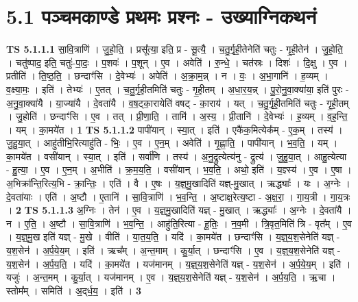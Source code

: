 \documentclass[17pt]{extarticle}
\begin{document}
\section*{ 5.1      पञ्चमकाण्डे प्रथमः प्रश्नः - उख्याग्निकथनं }
                                \textbf{ TS 5.1.1.1} \newline
                  सा॒वि॒त्राणि॑ । जु॒हो॒ति॒ । प्रसू᳚त्या॒ इति॒ प्र - सू॒त्यै॒ । च॒तु॒र्गृ॒ही॒तेनेति॑ चतुः - गृ॒ही॒तेन॑ । जु॒हो॒ति॒ । चतु॑ष्पाद॒ इति॒ चतुः॑-पा॒दः॒ । प॒शवः॑ । प॒शून् । ए॒व । अवेति॑ । रु॒न्धे॒ । चत॑स्रः । दिशः॑ । दि॒क्षु । ए॒व । प्रतीति॑ । ति॒ष्ठ॒ति॒ । छन्दाꣳ॑सि । दे॒वेभ्यः॑ । अपेति॑ । अ॒क्रा॒म॒न्न् । न । वः॒ । अ॒भा॒गानि॑ । ह॒व्यम् । व॒क्ष्या॒मः॒ । इति॑ । तेभ्यः॑ । ए॒तत् । च॒तु॒र्गृ॒ही॒तमिति॑ चतुः - गृ॒ही॒तम् । अ॒धा॒र॒य॒न्न् । पु॒रो॒नु॒वा॒क्या॑या॒ इति॑ पुरः - अ॒नु॒वा॒क्या॑यै । या॒ज्या॑यै । दे॒वता॑यै । व॒ष॒ट्का॒रायेति॑ वषट् - का॒राय॑ । यत् । च॒तु॒र्गृ॒ही॒तमिति॑ चतुः - गृ॒ही॒तम् । जु॒होति॑ । छन्दाꣳ॑सि । ए॒व । तत् । प्री॒णा॒ति॒ । तामि॑ । अ॒स्य॒ । प्री॒तानि॑ । दे॒वेभ्यः॑ । ह॒व्यम् । व॒ह॒न्ति॒ । यम् । का॒मये॑त । \textbf{  1} \newline
                  \newline
                                \textbf{ TS 5.1.1.2} \newline
                  पापी॑यान् । स्या॒त् । इति॑ । एकै॑क॒मित्येक᳚म् - ए॒क॒म् । तस्य॑ । जु॒हु॒या॒त् । आहु॑तीभि॒रित्याहु॑ति - भिः॒ । ए॒व । ए॒न॒म् । अवेति॑ । गृ॒ह्णा॒ति॒ । पापी॑यान् । भ॒व॒ति॒ । यम् । का॒मये॑त । वसी॑यान् । स्या॒त् । इति॑ । सर्वा॑णि । तस्य॑ । अ॒नु॒द्रुत्येत्य॑नु - द्रुत्य॑ । जु॒हु॒या॒त् । आहु॒त्येत्या - हु॒त्या॒ । ए॒व । ए॒न॒म् । अ॒भीति॑ । क्र॒म॒य॒ति॒ । वसी॑यान् । भ॒व॒ति॒ । अथो॒ इति॑ । य॒ज्ञ्स्य॑ । ए॒व । ए॒षा । अ॒भिक्रा᳚न्ति॒रित्य॒भि -  क्रा॒न्तिः॒ । एति॑ । वै । ए॒षः । य॒ज्ञ्॒मु॒खादिति॑ यज्ञ्-मु॒खात् । ऋद्ध्याः᳚ । यः । अ॒ग्नेः । दे॒वता॑याः । एति॑ । अ॒ष्टौ । ए॒तानि॑ । सा॒वि॒त्राणि॑ । भ॒व॒न्ति॒ । अ॒ष्टाक्ष॒रेत्य॒ष्टा - अ॒क्ष॒रा॒ । गा॒य॒त्री । गा॒य॒त्रः । \textbf{  2} \newline
                  \newline
                                \textbf{ TS 5.1.1.3} \newline
                  अ॒ग्निः । तेन॑ । ए॒व । य॒ज्ञ्॒मु॒खादिति॑ यज्ञ् - मु॒खात् । ऋद्ध्याः᳚ । अ॒ग्नेः । दे॒वता॑यै । न । ए॒ति॒ । अ॒ष्टौ । सा॒वि॒त्राणि॑ । भ॒व॒न्ति॒ । आहु॑ति॒रित्या - हू॒तिः॒ । न॒व॒मी । त्रि॒वृत॒मिति॑ त्रि - वृत᳚म् । ए॒व । य॒ज्ञ्॒मु॒ख इति॑ यज्ञ् - मु॒खे । वीति॑ । या॒त॒य॒ति॒ । यदि॑ । का॒मये॑त । छन्दाꣳ॑सि । य॒ज्ञ्॒य॒श॒सेनेति॑ यज्ञ् - य॒श॒सेन॑ । अ॒र्प॒ये॒य॒म् । इति॑ । ऋच᳚म् । अ॒न्त॒माम् । कु॒र्या॒त् । छन्दाꣳ॑सि । ए॒व । य॒ज्ञ्॒य॒श॒सेनेति॑ यज्ञ् - य॒श॒सेन॑ । अ॒र्प॒य॒ति॒ । यदि॑ । का॒मये॑त । यज॑मानम् । य॒ज्ञ्॒य॒श॒सेनेति॑ यज्ञ् - य॒श॒सेन॑ । अ॒र्प॒ये॒य॒म् । इति॑ । यजुः॑ । अ॒न्त॒मम् । कु॒र्या॒त् । यज॑मानम् । ए॒व । य॒ज्ञ्॒य॒श॒सेनेति॑ यज्ञ् - य॒श॒सेन॑ । अ॒र्प॒य॒ति॒ । ऋ॒चा । स्तोम᳚म् । समिति॑ । अ॒द्‌र्ध॒य॒ । इति॑ । \textbf{  3} \newline
\end{document}
